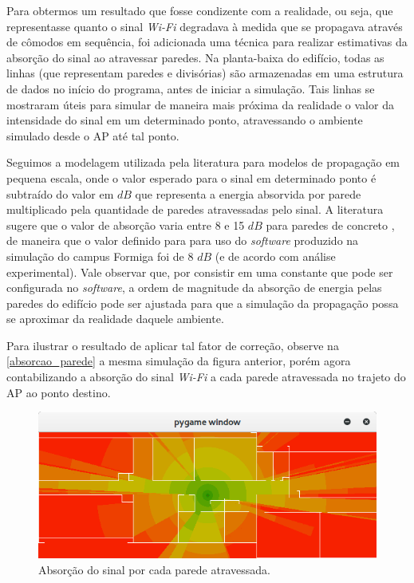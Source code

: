 \documentclass[
	12pt,				%
	twoside,			%
	a4paper,			%
	english,			%
	french,				%
	spanish,			%
	brazil				%
	]{abntex2}
\begin{document}
Para obtermos um resultado que fosse condizente com a realidade, ou
seja, que representasse quanto o sinal \emph{Wi-Fi} degradava à medida
que se propagava através de cômodos em sequência, foi adicionada uma
técnica para realizar estimativas da absorção do sinal ao atravessar
paredes. Na planta-baixa do edifício, todas as linhas (que representam
paredes e divisórias) são armazenadas em uma estrutura de dados no
início do programa, antes de iniciar a simulação. Tais linhas se
mostraram úteis para simular de maneira mais próxima da realidade o
valor da intensidade do sinal em um determinado ponto, atravessando o
ambiente simulado desde o AP até tal ponto.

Seguimos a modelagem utilizada pela literatura para modelos de
propagação em pequena escala, onde o valor esperado para o sinal em
determinado ponto é subtraído do valor em \(dB\) que representa a
energia absorvida por parede multiplicado pela quantidade de paredes
atravessadas pelo sinal. A literatura sugere que o valor de absorção
varia entre 8 e 15 \(dB\) para paredes de concreto \cite{RAPPAPORT}, de
maneira que o valor definido para para uso do \emph{software} produzido
na simulação do campus Formiga foi de 8 \(dB\) (e de acordo com análise
experimental). Vale observar que, por consistir em uma constante que
pode ser configurada no \emph{software}, a ordem de magnitude da
absorção de energia pelas paredes do edifício pode ser ajustada para que
a simulação da propagação possa se aproximar da realidade daquele
ambiente.

Para ilustrar o resultado de aplicar tal fator de correção, observe na
\autoref{absorcao_parede} a mesma simulação da figura anterior, porém
agora contabilizando a absorção do sinal \emph{Wi-Fi} a cada parede
atravessada no trajeto do AP ao ponto destino.

\begin{figure}[ht]
    \caption{\label{absorcao_parede} Absorção do sinal por cada parede atravessada.}
    \begin{center}
        \includegraphics[scale=0.7]{imagens/absorcao-parede.jpg}
    \end{center}
\end{figure}
\end{document}
